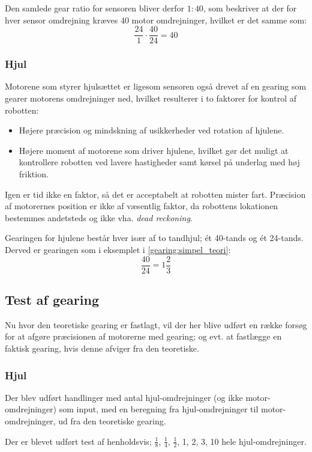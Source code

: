 Den samlede gear ratio for sensoren bliver derfor $1:40$, som beskriver at der for hver sensor omdrejning kræves 40 motor omdrejninger, hvilket er det samme som:
$$\frac{24}{1} \cdot \frac{40}{24} = 40$$

\subsubsection{Hjul}
Motorene som styrer hjulsættet er ligesom sensoren også drevet af en gearing som gearer motorens omdrejninger ned, hvilket resulterer i to faktorer for kontrol af robotten:

\begin{itemize}
\item Højere præcision og mindskning af usikkerheder ved rotation af hjulene.
\item Højere moment af motorene som driver hjulene, hvilket gør det muligt at kontrollere robotten ved lavere hastigheder samt kørsel på underlag med høj friktion.
\end{itemize}

Igen er tid ikke en faktor, så det er acceptabelt at robotten mister fart.
Præcision af motorernes position er ikke af væsentlig faktor, da robottens lokationen bestemmes andetsteds og ikke vha. \textit{dead reckoning}.

Gearingen for hjulene består hver især af to tandhjul; ét 40-tands og ét 24-tands.
Derved er gearingen som i eksemplet i \cref{gearing:simpel_teori}: $$ \frac{40}{24} = 1 \frac{2}{3} $$

\subsection{Test af gearing}\label{robot:gearing-test}
Nu hvor den teoretiske gearing er fastlagt, vil der her blive udført en række forsøg for at afgøre præcisionen af motorerne med gearing; og evt. at fastlægge en faktisk gearing, hvis denne afviger fra den teoretiske.

\subsubsection{Hjul}
Der blev udført handlinger med antal hjul-omdrejninger (og ikke motor-omdrejninger) som input, med en beregning fra hjul-omdrejninger til motor-omdrejninger, ud fra den teoretiske gearing.

Der er blevet udført test af henholdsvis; $\frac{1}{8}$, $\frac{1}{4}$, $\frac{1}{2}$, 1, 2, 3, 10 hele hjul-omdrejninger.

